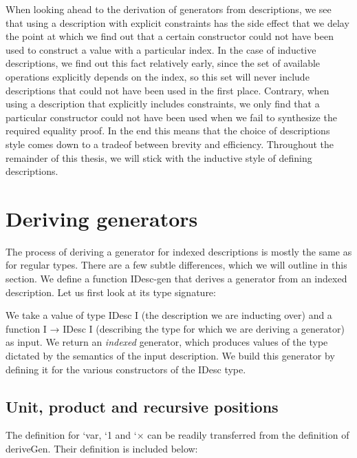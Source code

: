 \documentclass[a4paper,msc,twosized=semi]{uustthesis}
\let\oldemph\emph
\renewcommand\emph[1]{{\large\oldemph{#1}}}
\newcommand{\agda}[1]{{\agdafontinline\color{agdacolor}#1}}
\newcommand{\includeagda}[2]{\vspace*{-0.25cm}\begin{center}{\fontsize{12}{14}\agdafont\ExecuteMetaData[../src/chap0#1/latex/code.tex]{#2}}\end{center}\vspace*{-0.25cm}}
\begin{document}
  When looking ahead to the derivation of generators from descriptions, we see that 
  using a description with explicit constraints has the side effect that we delay the 
  point at which we find out that a certain constructor could not have been used to 
  construct a value with a particular index. In the case of inductive descriptions, we 
  find out this fact relatively early, since the set of available operations 
  explicitly depends on the index, so this set will never include descriptions that 
  could not have been used in the first place. Contrary, when using a description that 
  explicitly includes constraints, we only find that a particular constructor could 
  not have been used when we fail to synthesize the required equality proof. In the 
  end this means that the choice of descriptions style comes down to a tradeof between 
  brevity and efficiency. Throughout the remainder of this thesis, we will stick with 
  the inductive style of defining descriptions. 

\section{Deriving generators}

  The process of deriving a generator for indexed descriptions is mostly the same as 
  for regular types. There are a few subtle differences, which we will outline in this 
  section. We define a function \agda{IDesc-gen} that derives a generator from an indexed 
  description. Let us first look at its type signature: 

\includeagda{7}{idescgen}

  We take a value of type \agda{IDesc I} (the description we are inducting over) and a 
  function \agda{I → IDesc I} (describing the type for which we are deriving a generator) 
  as input. We return an \emph{indexed} generator, which produces values of the type 
  dictated by the semantics of the input description. We build this generator by 
  defining it for the various constructors of the \agda{IDesc} type. 

\subsection{Unit, product and recursive positions}
  
  The definition for \agda{`var}, \agda{`1} and \agda{`×} can be readily transferred from the 
  definition of \agda{deriveGen}. Their definition is included below: 
\end{document}
